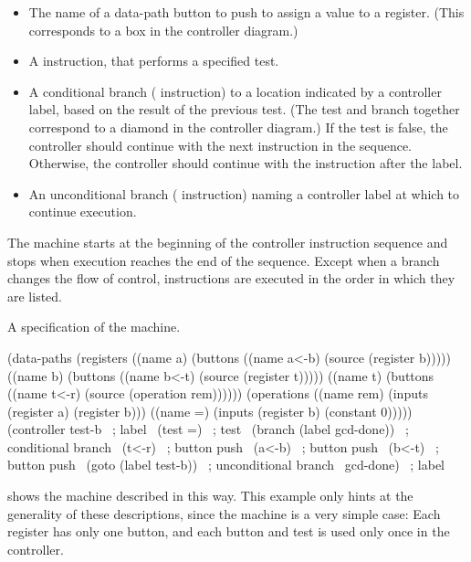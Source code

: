 \begin{itemize}
\item
The name of a data-path button to push to assign a value to a register.  (This
corresponds to a box in the controller diagram.)

\item
A  instruction, that performs a specified test.

\item
A conditional branch ( instruction) to a location indicated by a
controller label, based on the result of the previous test.  (The test and
branch together correspond to a diamond in the controller diagram.)  If the
test is false, the controller should continue with the next instruction in the
sequence.  Otherwise, the controller should continue with the instruction after
the label.

\item
An unconditional branch ( instruction) naming a controller label at
which to continue execution.
\end{itemize}

\noindent
The machine starts at the beginning of the controller instruction sequence and
stops when execution reaches the end of the sequence.  Except when a branch
changes the flow of control, instructions are executed in the order in which
they are listed.

\begin{codeFigure}{A specification of the 
machine.}
\begin{codeBlock}
(data-paths
 (registers
  ((name a)
   (buttons ((name a<-b) (source (register b)))))
  ((name b)
   (buttons ((name b<-t) (source (register t)))))
  ((name t)
   (buttons ((name t<-r) (source (operation rem))))))
 (operations
  ((name rem) (inputs (register a) (register b)))
  ((name =) (inputs (register b) (constant 0)))))
(controller
 test-b                           ~\textrm{; label}~
   (test =)                       ~\textrm{; test}~
   (branch (label gcd-done))      ~\textrm{; conditional branch}~
   (t<-r)                         ~\textrm{; button push}~
   (a<-b)                         ~\textrm{; button push}~
   (b<-t)                         ~\textrm{; button push}~
   (goto (label test-b))          ~\textrm{; unconditional branch}~
 gcd-done)                        ~\textrm{; label}~
\end{codeBlock}
\end{codeFigure}

\noindent
{} shows the  machine described in this way.  This
example only hints at the generality of these descriptions, since the
 machine is a very simple case: Each register has only one button,
and each button and test is used only once in the controller.

